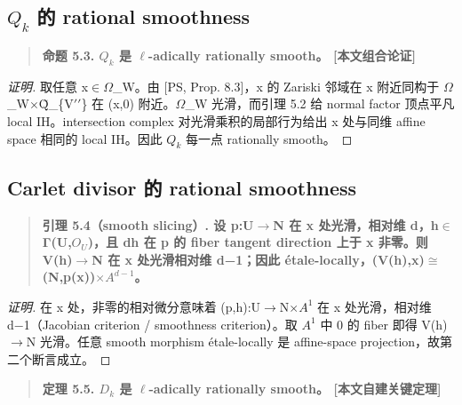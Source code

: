 \documentclass[11pt]{ctexart}
\begin{document}
\subsection{\ensuremath{Q_{k}} 的 rational smoothness}

\begin{quote}\textbf{命题 5.3. \ensuremath{Q_{k}} 是 \ensuremath{\ell}-adically rationally smooth。  [本文组合论证]}\end{quote}

\begin{proof}[证明] 

取任意 x\ensuremath{\in}\ensuremath{\Omega}\_W。由 [PS, Prop. 8.3]，x 的 Zariski 邻域在 x 附近同构于 \ensuremath{\Omega}\_W\ensuremath{\times}Q̃\_\{V\ensuremath{\prime\prime}\} 在 (x,0) 附近。\ensuremath{\Omega}\_W 光滑，而引理 5.2 给 normal factor 顶点平凡 local IH。intersection complex 对光滑乘积的局部行为给出 x 处与同维 affine space 相同的 local IH。因此 \ensuremath{Q_{k}} 每一点 rationally smooth。

\end{proof}

\subsection{Carlet divisor 的 rational smoothness}

\begin{quote}\textbf{引理 5.4（smooth slicing）. 设 p:U\ensuremath{\to}N 在 x 处光滑，相对维 d，h\ensuremath{\in}Γ(U,\ensuremath{O_{U}})，且 dh 在 p 的 fiber tangent direction 上于 x 非零。则 V(h)\ensuremath{\to}N 在 x 处光滑相对维 d−1；因此 étale-locally，(V(h),x)\ensuremath{\cong}(N,p(x))\ensuremath{\times}\ensuremath{A^{d−1}}。}\end{quote}

\begin{proof}[证明] 

在 x 处，非零的相对微分意味着 (p,h):U\ensuremath{\to}N\ensuremath{\times}\ensuremath{A^1} 在 x 处光滑，相对维 d−1（Jacobian criterion / smoothness criterion）。取 \ensuremath{A^1} 中 0 的 fiber 即得 V(h)\ensuremath{\to}N 光滑。任意 smooth morphism étale-locally 是 affine-space projection，故第二个断言成立。

\end{proof}

\begin{quote}\textbf{定理 5.5. \ensuremath{D_{k}} 是 \ensuremath{\ell}-adically rationally smooth。  [本文自建关键定理]}\end{quote}
\end{document}
